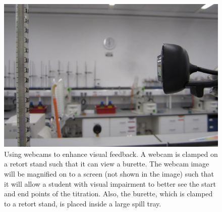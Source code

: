 \documentclass[11.5pt]{sig-alternate} %
\begin{document}
\begin{large}
\begin{figure}[htbp]
    \centering
    \includegraphics[width=0.95\columnwidth]{images/fig7.jpeg}
    \caption{Using webcams to enhance visual feedback. A webcam is clamped on a retort stand such that it can view a burette. The webcam image will be magnified on to a screen (not shown in the image) such that it will allow a student with visual impairment to better see the start and end points of the titration. Also, the burette, which is clamped to a retort stand, is placed inside a large spill tray.}
    \label{Figure 7}
\end{figure}


\end{large}
\end{document}
